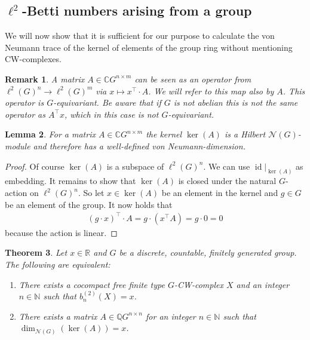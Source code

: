 \documentclass[12pt,a4paper]{scrartcl}
\theoremstyle{plain}
\newtheorem{Theorem}{Theorem}[section]
\newtheorem{Lemma}[Theorem]{Lemma}
\newtheorem{Remark}[Theorem]{Remark}
\theoremstyle{definition}
\numberwithin{equation}{section}
\newcommand{\C}{\mathbb{C}} %
\newcommand{\R}{\mathbb{R}} %
\newcommand{\Q}{\mathbb{Q}} %
\newcommand{\N}{\mathbb{N}} %
\newcommand{\2}{\mathbb{Z} / 2 \mathbb{Z}}
\newcommand{\1}{\bar{1}}
\newcommand{\0}{\bar{0}}
\newcommand{\id}{\operatorname{id}}
\begin{document}
\subsection{$\ell^2$-Betti numbers arising from a group}
We will now show that it is sufficient for our purpose to calculate the von Neumann trace of the kernel of elements of the group ring without mentioning CW-complexes.
\begin{Remark}\label{MAB}
	A matrix $A \in \C G^{n \times m}$ can be seen as an operator from $\ell^2(G)^n \to \ell^2(G)^m$ via $x \mapsto x^{\top} \cdot A$. We will refer to this map also by $A$. This operator is $G$-equivariant. Be aware that if $G$ is not abelian this is not the same operator as $A^\top x$, which in this case is not $G$-equivariant.
\end{Remark}
\begin{Lemma}
	For a matrix $A \in \C G^{n \times m}$ the kernel $\ker(A)$ is a Hilbert $\mathcal{N}(G)$-module and therefore has a well-defined von Neumann-dimension.
\end{Lemma}
\begin{proof}
	Of course $\ker(A)$ is a subspace of $\ell^2 (G)^n$. We can use $\id|_{\ker(A)}$ as embedding. It remains to show that $\ker(A)$ is closed under the natural $G$-action on $\ell^2 (G)^n$. So let $x \in \ker(A)$ be an element in the kernel and $g \in G$ be an element of the group. It now holds that
	\begin{align*}
		(g \cdot x)^\top \cdot A = g \cdot (x^\top A) = g \cdot 0 = 0
	\end{align*}
	because the action is linear.
\end{proof}
\begin{Theorem} \label{MCW}
	Let $x \in \R$ and $G$ be a discrete, countable, finitely generated group. The following are equivalent:
	\begin{enumerate}
		\item There exists a cocompact free finite type $G$-CW-complex $X$ and an integer $n \in \N$ such that $b_n^{(2)}(X)=x$.
		\item There exists a matrix $A \in \Q G^{n \times n}$ for an integer $n \in \N$ such that \newline $\dim_{\mathcal{N}(G)}(\ker (A))=x$.
	\end{enumerate}
\end{Theorem}
\end{document}
